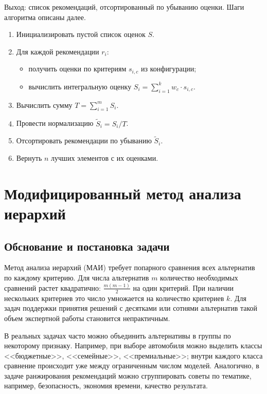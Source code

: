     Выход: список рекомендаций, отсортированный по убыванию оценки.
    \clearpage
    Шаги алгоритма описаны далее.
    \begin{enumerate}
        \item Инициализировать пустой список оценок \(S\).
        \item Для каждой рекомендации \(r_i\):
        \begin{itemize}
                \item получить оценки по критериям \(s_{i,c}\) из конфигурации;
                \item вычислить интегральную оценку \(S_i = \sum_{i=1} ^k w_c \cdot s_{i,c}\).
            \end{itemize}
            \item Вычислить сумму \(T = \sum_{i=1}^{m} S_i\).
            \item Провести нормализацию \(\tilde{S}_i = S_i / T\).
        \item Отсортировать рекомендации по убыванию \(\tilde{S}_i\).
        \item Вернуть $n$ лучших элементов с их оценками.
    \end{enumerate}

\section{Модифицированный метод анализа иерархий}
\label{MAI}

\subsection*{Обснование и постановка задачи}

Метод анализа иерархий (МАИ) требует попарного сравнения всех альтернатив по каждому критерию.
Для числа альтернатив \(m\) количество необходимых сравнений растет квадратично: \(\frac{m(m-1)}{2}\) на один критерий.
При наличии нескольких критериев это число умножается на количество критериев \(k\). 
Для задач поддержки принятия решений с десятками или сотнями альтернатив такой объем экспертной работы становится непрактичным.

В реальных задачах часто можно объединить альтернативы в группы по некоторому признаку.
Например, при выборе автомобиля можно выделить классы <<бюджетные>>, <<семейные>>, <<премиальные>>; внутри каждого класса сравнение происходит уже между ограниченным числом моделей.
Аналогично, в задаче ранжирования рекомендаций можно сгруппировать советы по тематике, например, безопасность, экономия времени, качество результата.

